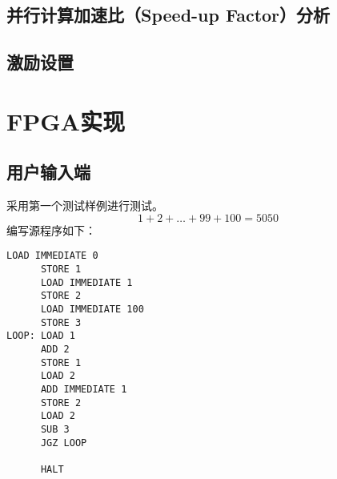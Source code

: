 \documentclass[lang=cn,a4paper,newtx]{elegantpaper}
\begin{document}
\subsection{并行计算加速比（Speed-up Factor）分析}
\subsection{激励设置}

\section{FPGA实现}
\subsection{用户输入端}
采用第一个测试样例进行测试。
$$
1+2+\dots +99 +100 =5050
$$
编写源程序如下：
\begin{lstlisting}[language=Assembly]
      LOAD IMMEDIATE 0 
      STORE 1
      LOAD IMMEDIATE 1
      STORE 2
      LOAD IMMEDIATE 100
      STORE 3
LOOP: LOAD 1
      ADD 2
      STORE 1
      LOAD 2
      ADD IMMEDIATE 1
      STORE 2
      LOAD 2
      SUB 3
      JGZ LOOP

      HALT
\end{lstlisting}
\nocite{FPGA-CPU}
\end{document}
